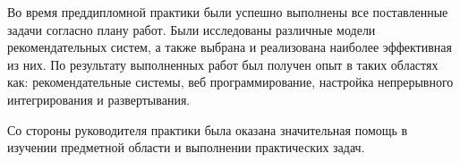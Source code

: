 Во время преддипломной практики были успешно выполнены все поставленные задачи
согласно плану работ. Были исследованы различные модели рекомендательных систем, а
также выбрана и реализована наиболее эффективная из них. По результату выполненных
работ был получен опыт в таких областях как: рекомендательные системы, веб программирование,
настройка непрерывного интегрирования и развертывания.

Со стороны руководителя практики была оказана значительная помощь в
изучении предметной области и выполнении практических задач.
